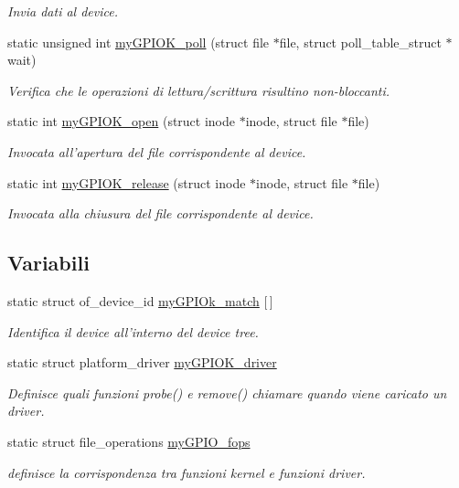 \begin{DoxyCompactItemize}
\begin{DoxyCompactList}\small\item\em Invia dati al device. \end{DoxyCompactList}\item 
static unsigned int \hyperlink{group___kernel-_module_ga27a9fd0cd8497c6fb4415ffcf0733270}{my\+G\+P\+I\+O\+K\+\_\+poll} (struct file $\ast$file, struct poll\+\_\+table\+\_\+struct $\ast$wait)
\begin{DoxyCompactList}\small\item\em Verifica che le operazioni di lettura/scrittura risultino non-\/bloccanti. \end{DoxyCompactList}\item 
static int \hyperlink{group___kernel-_module_ga7aa7d2d19eb7034855c87a17e433918d}{my\+G\+P\+I\+O\+K\+\_\+open} (struct inode $\ast$inode, struct file $\ast$file)
\begin{DoxyCompactList}\small\item\em Invocata all'apertura del file corrispondente al device. \end{DoxyCompactList}\item 
static int \hyperlink{group___kernel-_module_gaf310cbdd4b64b3e108ed0cd67374fa9b}{my\+G\+P\+I\+O\+K\+\_\+release} (struct inode $\ast$inode, struct file $\ast$file)
\begin{DoxyCompactList}\small\item\em Invocata alla chiusura del file corrispondente al device. \end{DoxyCompactList}\end{DoxyCompactItemize}
\subsection*{Variabili}
\begin{DoxyCompactItemize}
\item 
static struct of\+\_\+device\+\_\+id \hyperlink{group___kernel-_module_ga91f28437e0a553effa546d16fa44f03a}{my\+G\+P\+I\+Ok\+\_\+match} \mbox{[}$\,$\mbox{]}
\begin{DoxyCompactList}\small\item\em Identifica il device all'interno del device tree. \end{DoxyCompactList}\item 
static struct platform\+\_\+driver \hyperlink{group___kernel-_module_ga8dba1541b58fa63f8208232ffce4fc47}{my\+G\+P\+I\+O\+K\+\_\+driver}
\begin{DoxyCompactList}\small\item\em Definisce quali funzioni probe() e remove() chiamare quando viene caricato un driver. \end{DoxyCompactList}\item 
static struct file\+\_\+operations \hyperlink{group___kernel-_module_ga9f31111fdb3b4a5944e18d45045e0f01}{my\+G\+P\+I\+O\+\_\+fops}
\begin{DoxyCompactList}\small\item\em definisce la corrispondenza tra funzioni kernel e funzioni driver. \end{DoxyCompactList}\end{DoxyCompactItemize}


